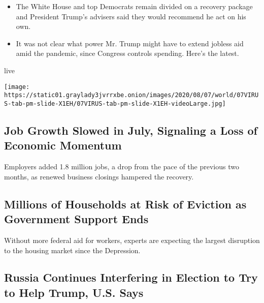 \begin{itemize}
\tightlist
\item
  The White House and top Democrats remain divided on a recovery package
  and President Trump's advisers said they would recommend he act on his
  own.
\item
  It was not clear what power Mr. Trump might have to extend jobless aid
  amid the pandemic, since Congress controls spending. Here's the
  latest.
\end{itemize}

live

\texttt{[image: https://static01.graylady3jvrrxbe.onion/images/2020/08/07/world/07VIRUS-tab-pm-slide-X1EH/07VIRUS-tab-pm-slide-X1EH-videoLarge.jpg]}

\href{/2020/08/07/business/economy/july-jobs-report.html}{}

\hypertarget{job-growth-slowed-in-july-signaling-a-loss-of-economic-momentum}{%
\subsection{Job Growth Slowed in July, Signaling a Loss of Economic
Momentum}\label{job-growth-slowed-in-july-signaling-a-loss-of-economic-momentum}}

Employers added 1.8 million jobs, a drop from the pace of the previous
two months, as renewed business closings hampered the recovery.

\href{/2020/08/07/business/economy/housing-economy-eviction-renters.html}{}

\hypertarget{millions-of-households-at-risk-of-eviction-as-government-support-ends}{%
\subsection{Millions of Households at Risk of Eviction as Government
Support
Ends}\label{millions-of-households-at-risk-of-eviction-as-government-support-ends}}

Without more federal aid for workers, experts are expecting the largest
disruption to the housing market since the Depression.

\href{/2020/08/07/us/politics/russia-china-trump-biden-election-interference.html}{}

\hypertarget{russia-continues-interfering-in-election-to-try-to-help-trump-us-says}{%
\subsection{Russia Continues Interfering in Election to Try to Help
Trump, U.S.
Says}\label{russia-continues-interfering-in-election-to-try-to-help-trump-us-says}}

